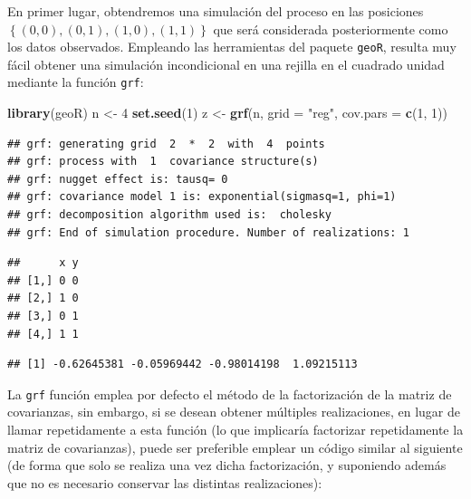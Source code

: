 \documentclass[
]{book}
\newenvironment{Shaded}{\begin{snugshade}}{\end{snugshade}}
\newcommand{\CommentTok}[1]{\textcolor[rgb]{0.56,0.35,0.01}{\textit{#1}}}
\newcommand{\DataTypeTok}[1]{\textcolor[rgb]{0.13,0.29,0.53}{#1}}
\newcommand{\DecValTok}[1]{\textcolor[rgb]{0.00,0.00,0.81}{#1}}
\newcommand{\KeywordTok}[1]{\textcolor[rgb]{0.13,0.29,0.53}{\textbf{#1}}}
\newcommand{\NormalTok}[1]{#1}
\newcommand{\OperatorTok}[1]{\textcolor[rgb]{0.81,0.36,0.00}{\textbf{#1}}}
\newcommand{\StringTok}[1]{\textcolor[rgb]{0.31,0.60,0.02}{#1}}
\theoremstyle{break}
\theoremstyle{definition}
\theoremstyle{definition}
\theoremstyle{definition}
\theoremstyle{remark}
\begin{document}
En primer lugar, obtendremos una simulación del proceso en las posiciones
\(\left\{(0,0),(0,1),(1,0),(1,1)\right\}\) que será considerada posteriormente
como los datos observados.
Empleando las herramientas del paquete \texttt{geoR}, resulta muy fácil obtener
una simulación incondicional en una rejilla en el cuadrado unidad
mediante la función \texttt{grf}:

\begin{Shaded}
\begin{Highlighting}[]
\KeywordTok{library}\NormalTok{(geoR)}
\NormalTok{n <-}\StringTok{ }\DecValTok{4}
\KeywordTok{set.seed}\NormalTok{(}\DecValTok{1}\NormalTok{)}
\NormalTok{z <-}\StringTok{ }\KeywordTok{grf}\NormalTok{(n, }\DataTypeTok{grid =} \StringTok{"reg"}\NormalTok{, }\DataTypeTok{cov.pars =} \KeywordTok{c}\NormalTok{(}\DecValTok{1}\NormalTok{, }\DecValTok{1}\NormalTok{))}
\end{Highlighting}
\end{Shaded}

\begin{verbatim}
## grf: generating grid  2  *  2  with  4  points
## grf: process with  1  covariance structure(s)
## grf: nugget effect is: tausq= 0 
## grf: covariance model 1 is: exponential(sigmasq=1, phi=1)
## grf: decomposition algorithm used is:  cholesky 
## grf: End of simulation procedure. Number of realizations: 1
\end{verbatim}

\begin{Shaded}
\end{Shaded}

\begin{verbatim}
##      x y
## [1,] 0 0
## [2,] 1 0
## [3,] 0 1
## [4,] 1 1
\end{verbatim}

\begin{Shaded}
\end{Shaded}

\begin{verbatim}
## [1] -0.62645381 -0.05969442 -0.98014198  1.09215113
\end{verbatim}

La \texttt{grf} función emplea por defecto el método de la factorización de la matriz de covarianzas,
sin embargo, si se desean obtener múltiples realizaciones, en lugar de llamar repetidamente a esta función (lo que implicaría factorizar repetidamente la matriz de covarianzas),
puede ser preferible emplear un código similar al siguiente (de forma que solo se realiza una vez dicha factorización, y suponiendo además que no es necesario conservar las distintas realizaciones):
\end{document}
